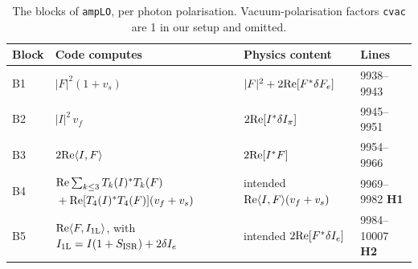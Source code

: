 \documentclass[11pt,a4paper]{article}
\newcommand{\code}[1]{\texttt{#1}}
\begin{document}
\begin{table}[htbp]

\centering\small
\caption{The blocks of \code{ampLO}, per photon polarisation. Vacuum-polarisation
  factors \code{cvac} are 1 in our setup and omitted.}
\label{tab:phok-blocks}
\begin{tabularx}{\textwidth}{@{}l>{\raggedright\arraybackslash}Xll@{}}
\toprule
Block & Code computes & Physics content & Lines \\
\midrule
B1 & $|F|^2(1+v_s)$ & $|F|^2+2{\rm Re}[F^*\delta F_e]$ & 9938--9943 \\
B2 & $|I|^2\,v_f$  & $2{\rm Re}[I^*\delta I_\pi]$ & 9945--9951 \\
B3 & $2{\rm Re}\langle I,F\rangle$ & $2{\rm Re}[I^*F]$ & 9954--9966 \\
B4 & ${\rm Re}\sum_{k\le3}T_k(I)^*T_k(F)$ ${}+{\rm Re}[T_4(I)^*T_4(F)](v_f+v_s)$
   & intended ${\rm Re}\langle I,F\rangle(v_f+v_s)$ & 9969--9982 \textbf{H1} \\
B5 & ${\rm Re}\langle F,I_{\rm 1L}\rangle$, with $I_{\rm 1L}=I(1+S_{\rm ISR})+2\delta I_e$
   & intended $2{\rm Re}[F^*\delta I_e]$ & 9984--10007 \textbf{H2} \\
\bottomrule
\end{tabularx}
\end{table}
\end{document}
